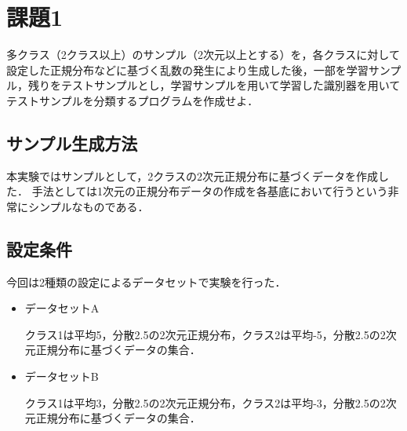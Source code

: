 \section*{課題1}
多クラス（2クラス以上）のサンプル（2次元以上とする）を，各クラスに対して設定した正規分布などに基づく乱数の発生により生成した後，一部を学習サンプル，残りをテストサンプルとし，学習サンプルを用いて学習した識別器を用いてテストサンプルを分類するプログラムを作成せよ．

\subsection*{サンプル生成方法}
本実験ではサンプルとして，2クラスの2次元正規分布に基づくデータを作成した．
手法としては1次元の正規分布データの作成を各基底において行うという非常にシンプルなものである．

\subsection*{設定条件}
今回は2種類の設定によるデータセットで実験を行った．
\begin{itemize}
    \setlength{\itemsep}{3mm}
    \item データセットA\par
    \quad
    クラス1は平均5，分散2.5の2次元正規分布，クラス2は平均-5，分散2.5の2次元正規分布に基づくデータの集合．
    \item データセットB\par
    \quad
    クラス1は平均3，分散2.5の2次元正規分布，クラス2は平均-3，分散2.5の2次元正規分布に基づくデータの集合．
\end{itemize}

